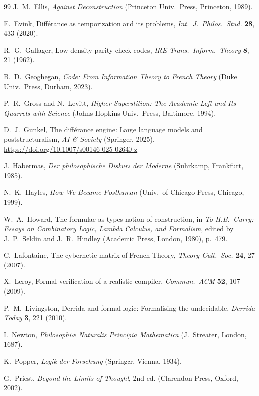 \documentclass[a4paper,twocolumn,11pt]{article}
\begin{document}
\begin{thebibliography}{99}
J.~M.~Ellis,
\emph{Against Deconstruction}
(Princeton Univ.\ Press, Princeton, 1989).

E.~Evink,
Diff\'erance as temporization and its problems,
\emph{Int.\ J.\ Philos.\ Stud.} \textbf{28}, 433 (2020).

R.~G.~Gallager,
Low-density parity-check codes,
\emph{IRE Trans.\ Inform.\ Theory} \textbf{8}, 21 (1962).

B.~D.~Geoghegan,
\emph{Code: From Information Theory to French Theory}
(Duke Univ.\ Press, Durham, 2023).

P.~R.~Gross and N.~Levitt,
\emph{Higher Superstition: The Academic Left and Its Quarrels with Science}
(Johns Hopkins Univ.\ Press, Baltimore, 1994).

D.~J.~Gunkel,
The diff\'erance engine: Large language models and poststructuralism,
\emph{AI \& Society} (Springer, 2025).
\url{https://doi.org/10.1007/s00146-025-02640-z}

J.~Habermas,
\emph{Der philosophische Diskurs der Moderne}
(Suhrkamp, Frankfurt, 1985).

N.~K.~Hayles,
\emph{How We Became Posthuman}
(Univ.\ of Chicago Press, Chicago, 1999).

W.~A.~Howard,
The formulae-as-types notion of construction,
in \emph{To H.B.\ Curry: Essays on Combinatory Logic, Lambda Calculus, and Formalism},
edited by J.~P.~Seldin and J.~R.~Hindley
(Academic Press, London, 1980), p.~479.

C.~Lafontaine,
The cybernetic matrix of French Theory,
\emph{Theory Cult.\ Soc.} \textbf{24}, 27 (2007).

X.~Leroy,
Formal verification of a realistic compiler,
\emph{Commun.\ ACM} \textbf{52}, 107 (2009).

P.~M.~Livingston,
Derrida and formal logic: Formalising the undecidable,
\emph{Derrida Today} \textbf{3}, 221 (2010).

I.~Newton,
\emph{Philosophi\ae{} Naturalis Principia Mathematica}
(J.~Streater, London, 1687).

K.~Popper,
\emph{Logik der Forschung}
(Springer, Vienna, 1934).

G.~Priest,
\emph{Beyond the Limits of Thought}, 2nd ed.
(Clarendon Press, Oxford, 2002).


\end{thebibliography}
\end{document}
